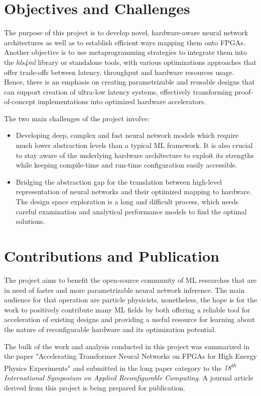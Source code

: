 \section{Objectives and Challenges}
The purpose of this project is to develop novel, hardware-aware neural network architectures as well as to establish efficient ways mapping them onto FPGAs. Another objective is to use metaprogramming strategies to integrate them into the \textit{hls4ml} library or standalone tools, with various optimizations approaches that offer trade-offs between latency, throughput and hardware resources usage. Hence, there is an emphasis on creating parametrizable and reusable designs that can support creation of ultra-low latency systems, effectively transforming proof-of-concept implementations into optimized hardware accelerators.

The two main challenges of the project involve:
\begin{itemize}
  \item Developing deep, complex and fast neural network models which require much lower abstraction levels than a typical ML framework. It is also crucial to stay aware of the underlying hardware architecture to exploit its strengths while keeping compile-time and run-time configuration easily accessible.
  \item Bridging the abstraction gap for the translation between high-level representation of neural networks and their optimized mapping to hardware. The design space exploration is a long and difficult process, which needs careful examination and analytical performance models to find the optimal solutions.
\end{itemize}


\section{Contributions and Publication}
The project aims to benefit the open-source community of ML researches that are in need of faster and more parametrizable neural network inference. The main audience for that operation are particle physicists, nonetheless, the hope is for the work to positively contribute many ML fields by both offering a reliable tool for acceleration of existing designs and providing a useful resource for learning about the nature of reconfigurable hardware and its optimization potential.

The bulk of the work and analysis conducted in this project was summarized in the paper "Accelerating Transformer Neural Networks on FPGAs for High Energy Physics Experiments" and submitted in the long paper category to the \textit{18\textsuperscript{th} International Symposium on Applied Reconfigurable Computing}. A journal article derived from this project is being prepared for publication.


